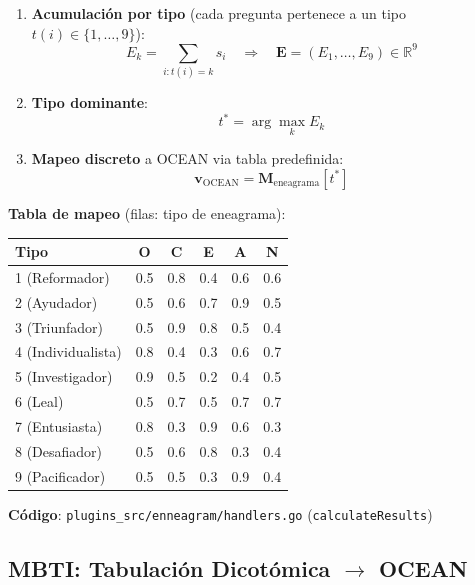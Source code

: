 \documentclass[12pt,a4paper]{article}
\begin{document}
\begin{enumerate}
    \item \textbf{Acumulación por tipo} (cada pregunta pertenece a un tipo $t(i) \in \{1, \ldots, 9\}$):
    \[
    E_k = \sum_{i: t(i) = k} s_i \quad \Rightarrow \quad \mathbf{E} = (E_1, \ldots, E_9) \in \mathbb{R}^9
    \]
    
    \item \textbf{Tipo dominante}:
    \[
    t^* = \arg\max_{k} E_k
    \]
    
    \item \textbf{Mapeo discreto} a OCEAN via tabla predefinida:
    \[
    \mathbf{v}_{\text{OCEAN}} = \mathbf{M}_{\text{eneagrama}}[t^*]
    \]
\end{enumerate}

\textbf{Tabla de mapeo} (filas: tipo de eneagrama):

\begin{table}[h]
\centering
\small
\begin{tabular}{lccccc}
\toprule
\textbf{Tipo} & \textbf{O} & \textbf{C} & \textbf{E} & \textbf{A} & \textbf{N} \\
\midrule
1 (Reformador) & 0.5 & 0.8 & 0.4 & 0.6 & 0.6 \\
2 (Ayudador) & 0.5 & 0.6 & 0.7 & 0.9 & 0.5 \\
3 (Triunfador) & 0.5 & 0.9 & 0.8 & 0.5 & 0.4 \\
4 (Individualista) & 0.8 & 0.4 & 0.3 & 0.6 & 0.7 \\
5 (Investigador) & 0.9 & 0.5 & 0.2 & 0.4 & 0.5 \\
6 (Leal) & 0.5 & 0.7 & 0.5 & 0.7 & 0.7 \\
7 (Entusiasta) & 0.8 & 0.3 & 0.9 & 0.6 & 0.3 \\
8 (Desafiador) & 0.5 & 0.6 & 0.8 & 0.3 & 0.4 \\
9 (Pacificador) & 0.5 & 0.5 & 0.3 & 0.9 & 0.4 \\
\bottomrule
\end{tabular}
\end{table}

\textbf{Código}: \texttt{plugins\_src/enneagram/handlers.go} (\texttt{calculateResults})

\subsection{MBTI: Tabulación Dicotómica $\to$ OCEAN}
\label{subsec:mbti}
\end{document}

